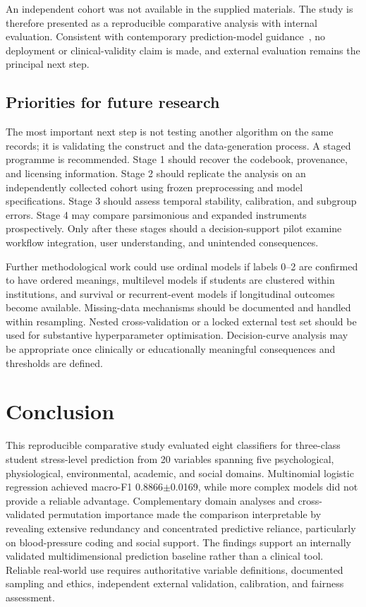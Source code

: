 \documentclass[review]{elsarticle}
\begin{document}
An independent cohort was not available in the supplied materials. The study is therefore presented as a reproducible comparative analysis with internal evaluation. Consistent with contemporary prediction-model guidance~\cite{collins2024,van2024evaluation,moons2025}, no deployment or clinical-validity claim is made, and external evaluation remains the principal next step.

\subsection{Priorities for future research}
The most important next step is not testing another algorithm on the same records; it is validating the construct and the data-generation process. A staged programme is recommended. Stage 1 should recover the codebook, provenance, and licensing information. Stage 2 should replicate the analysis on an independently collected cohort using frozen preprocessing and model specifications. Stage 3 should assess temporal stability, calibration, and subgroup errors. Stage 4 may compare parsimonious and expanded instruments prospectively. Only after these stages should a decision-support pilot examine workflow integration, user understanding, and unintended consequences.

Further methodological work could use ordinal models if labels 0--2 are confirmed to have ordered meanings, multilevel models if students are clustered within institutions, and survival or recurrent-event models if longitudinal outcomes become available. Missing-data mechanisms should be documented and handled within resampling. Nested cross-validation or a locked external test set should be used for substantive hyperparameter optimisation. Decision-curve analysis may be appropriate once clinically or educationally meaningful consequences and thresholds are defined.

\section{Conclusion}\label{sec:conclusion}
This reproducible comparative study evaluated eight classifiers for three-class student stress-level prediction from 20 variables spanning five psychological, physiological, environmental, academic, and social domains. Multinomial logistic regression achieved macro-F1 0.8866$\pm$0.0169, while more complex models did not provide a reliable advantage. Complementary domain analyses and cross-validated permutation importance made the comparison interpretable by revealing extensive redundancy and concentrated predictive reliance, particularly on blood-pressure coding and social support. The findings support an internally validated multidimensional prediction baseline rather than a clinical tool. Reliable real-world use requires authoritative variable definitions, documented sampling and ethics, independent external validation, calibration, and fairness assessment.
\end{document}

